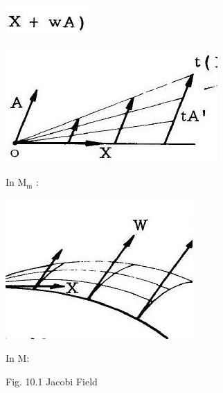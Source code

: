 \documentclass[10pt]{article}
\begin{document}
\includegraphics[max width=\textwidth]{2022_07_16_f4e476ee2159dc67e746g-77}

\includegraphics[max width=\textwidth]{2022_07_16_f4e476ee2159dc67e746g-77(1)}

In $\mathrm{M}_{\mathrm{m}}$ :

\includegraphics[max width=\textwidth]{2022_07_16_f4e476ee2159dc67e746g-77(2)}

In M:

Fig. 10.1 Jacobi Field
\end{document}
